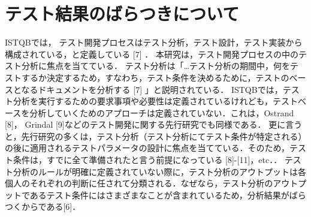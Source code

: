 \documentclass[a4paper,12pt]{jreport}
\begin{document}
\section{テスト結果のばらつきについて}

ISTQBでは， テスト開発プロセスはテスト分析，テスト設計，テスト実装から構成されている，と定義している [7] ．
本研究は，テスト開発プロセスの中のテスト分析に焦点を当てている．
テスト分析は「…テスト分析の期間中，何をテストするか決定するため，すなわち，テスト条件を決めるために，テストのベースとなるドキュメントを分析する [7] 」と説明されている．
ISTQBでは，テスト分析を実行するための要求事項や必要性は定義されているけれども，テストベースを分析していくためのアプローチは定義されていない．これは，Ostrand [8]， Grindal [9]などのテスト開発に関する先行研究でも同様である．
更に言うと，先行研究の多くは，テスト分析（テスト分析にてテスト条件が特定される）の後に適用されるテストパラメータの設計に焦点を当てている．そのため，テスト条件は，すでに全て準備されたと言う前提になっている [8]-[11]，etc．．
テスト分析のルールが明確に定義されていない際に，テスト分析のアウトプットは各個人のそれぞれの判断に任されて分類される．なぜなら，テスト分析のアウトプットであるテスト条件にはさまざまなことが含まれているため，分析結果がばらつくからである[6]．
\end{document}
